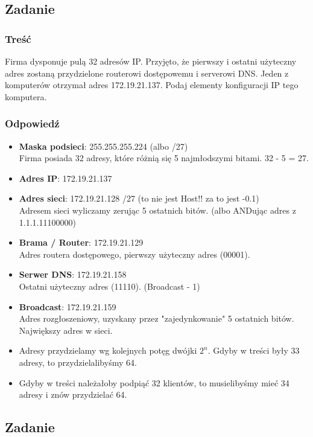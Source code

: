 \newpage
	\subsection{Zadanie}
		\subsubsection{Treść}
			Firma dysponuje pulą 32 adresów IP. Przyjęto, że pierwszy i ostatni użyteczny adres zostaną przydzielone routerowi dostępowemu i serverowi DNS. Jeden z komputerów otrzymał adres 172.19.21.137. Podaj elementy konfiguracji IP tego komputera.
		\subsubsection{Odpowiedź}
			\begin{itemize}
				\item \textbf{Maska podsieci}: 255.255.255.224 (albo /27)\\
				Firma posiada 32 adresy, które różnią się 5 najmłodszymi bitami. 32 - 5 = 27.
				\item \textbf{Adres IP}: 172.19.21.137
				\item \textbf{Adres sieci}: 172.19.21.128 /27 (to nie jest Host!! za to jest -0.1)\\
				Adresem sieci wyliczamy zerując 5 ostatnich bitów. (albo ANDując adres z 1.1.1.11100000)
				\item \textbf{Brama / Router}: 172.19.21.129\\
				Adres routera dostępowego, pierwszy użyteczny adres (00001).
				\item \textbf{Serwer DNS}: 172.19.21.158\\
				Ostatni użyteczny adres (11110). (Broadcast - 1)
				\item \textbf{Broadcast}: 172.19.21.159\\
				Adres rozgłoszeniowy, uzyskany przez "zajedynkowanie" 5 ostatnich bitów. Największy adres w sieci.
				\item Adresy przydzielamy wg kolejnych potęg dwójki $ 2^n $. Gdyby w treści były 33 adresy, to przydzielalibyśmy 64.
				\item Gdyby w treści należałoby podpiąć 32 klientów, to musielibyśmy mieć 34 adresy i znów przydzielać 64.
			\end{itemize}
	\subsection{Zadanie}
